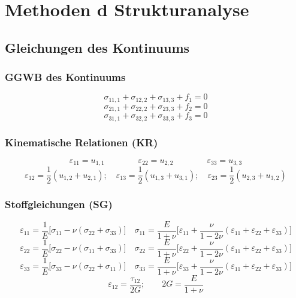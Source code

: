 \section{Methoden d Strukturanalyse}
    \subsection{Gleichungen des Kontinuums}
        \subsubsection{GGWB des Kontinuums}
            \small
            \[\sigma_{11,1} + \sigma_{12,2} + \sigma_{13,3} + f_1 = 0\]
            \[\sigma_{21,1} + \sigma_{22,2} + \sigma_{23,3} + f_2 = 0\]
            \[\sigma_{31,1} + \sigma_{32,2} + \sigma_{33,3} + f_3 = 0\]
            
        \subsubsection{Kinematische Relationen (KR)}
            \[\varepsilon_{11} = u_{1,1}\qquad\qquad\varepsilon_{22} = u_{2,2}\qquad\qquad\varepsilon_{33} = u_{3,3}\]
            \[\varepsilon_{12} = \frac{1}{2}(u_{1,2} + u_{2,1});\quad\varepsilon_{13} = \frac{1}{2}(u_{1,3} + u_{3,1});\quad\varepsilon_{23} = \frac{1}{2}(u_{2,3} + u_{3,2})\]
            
        \subsubsection{Stoffgleichungen (SG)}
            \[\varepsilon_{11} = \frac{1}{E}\lbrack\sigma_{11} - \nu(\sigma_{22} + \sigma_{33})\rbrack \quad \sigma_{11}=\frac{E}{1+\nu}\lbrack\varepsilon_{11}+\frac{\nu}{1-2\nu}(\varepsilon_{11}+\varepsilon_{22}+\varepsilon_{33})\rbrack\]
            \[\varepsilon_{22} = \frac{1}{E}\lbrack\sigma_{22} - \nu(\sigma_{11} + \sigma_{33})\rbrack \quad \sigma_{22}=\frac{E}{1+\nu}\lbrack\varepsilon_{22}+\frac{\nu}{1-2\nu}(\varepsilon_{11}+\varepsilon_{22}+\varepsilon_{33})\rbrack\]
            \[\varepsilon_{33} = \frac{1}{E}\lbrack\sigma_{33} - \nu(\sigma_{22} + \sigma_{11})\rbrack \quad \sigma_{33}=\frac{E}{1+\nu}\lbrack\varepsilon_{33}+\frac{\nu}{1-2\nu}(\varepsilon_{11}+\varepsilon_{22}+\varepsilon_{33})\rbrack\]
            \[\varepsilon_{12}=\frac{\tau_{12}}{2G}; \qquad 2G=\frac{E}{1+\nu}\]
            \normalsize

    